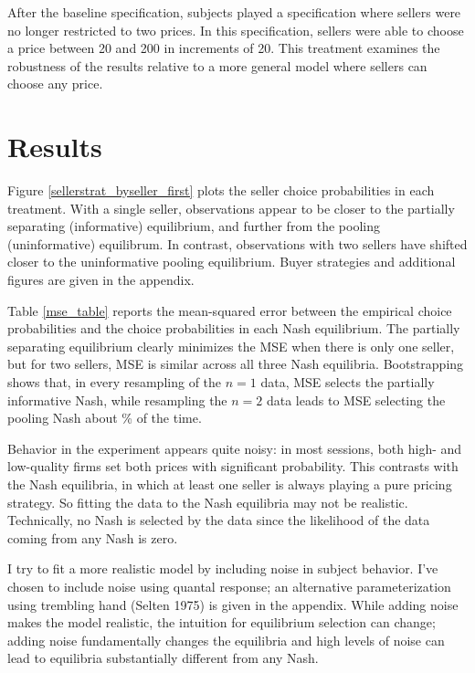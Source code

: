 \documentclass[12pt]{article}
\begin{document}
After the baseline specification, subjects played a specification where sellers were no longer restricted to two prices. In this specification, sellers were able to choose a price between 20 and 200 in increments of 20. This treatment examines the robustness of the results relative to a more general model where sellers can choose any price. 




\section{Results}

Figure \ref{sellerstrat_byseller_first} plots the seller choice probabilities in each treatment. With a single seller, observations appear to be closer to the partially separating (informative) equilibrium, and further from the pooling (uninformative) equilibrum. In contrast, observations with two sellers have shifted closer to the uninformative pooling equilibrium. Buyer strategies and additional figures are given in the appendix.



Table \ref{mse_table} reports the mean-squared error between the empirical choice probabilities and the choice probabilities in each Nash equilibrium. The partially separating equilibrium clearly minimizes the MSE when there is only one seller, but for two sellers, MSE is similar across all three Nash equilibria. Bootstrapping shows that, in every resampling of the $n = 1$ data, MSE selects the partially informative Nash, while resampling the $n=2$ data leads to MSE selecting the pooling Nash about \msepooltwo \% of the time.



Behavior in the experiment appears quite noisy: in most sessions, both high- and low-quality firms set both prices with significant probability. This contrasts with the Nash equilibria, in which at least one seller is always playing a pure pricing strategy. So fitting the data to the Nash equilibria may not be realistic. Technically, no Nash is selected by the data since the likelihood of the data coming from any Nash is zero. 

I try to fit a more realistic model by including noise in subject behavior. I've chosen to include noise using quantal response; an alternative parameterization using trembling hand (Selten 1975) is given in the appendix. While adding noise makes the model realistic, the intuition for equilibrium selection can change; adding noise fundamentally changes the equilibria and high levels of noise can lead to equilibria substantially different from any Nash.
\end{document}
